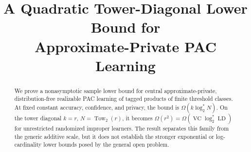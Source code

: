 \documentclass[11pt,letterpaper]{article}
\title{\LARGE A Quadratic Tower-Diagonal Lower Bound for\\Approximate-Private PAC Learning}
\author{}
\date{}
\providecommand{\VC}{\operatorname{VC}}
\providecommand{\LD}{\operatorname{LD}}
\begin{document}
\maketitle

\begin{abstract}
We prove a nonasymptotic sample lower bound for central approximate-private,
distribution-free realizable PAC learning of tagged products of finite
threshold classes.  At fixed constant accuracy, confidence, and privacy, the
bound is $\Omega(k\log_2^*N)$.  On the tower diagonal
$k=r$, $N=\operatorname{Tow}_2(r)$, it becomes
$\Omega(r^2)=\Omega(\VC\log_2^*\LD)$ for unrestricted randomized improper
learners.  The result separates this family from the generic additive scale,
but it does not establish the stronger exponential or log-cardinality lower
bounds posed by the general open problem.
\end{abstract}






\newpage



\newpage

\end{document}

